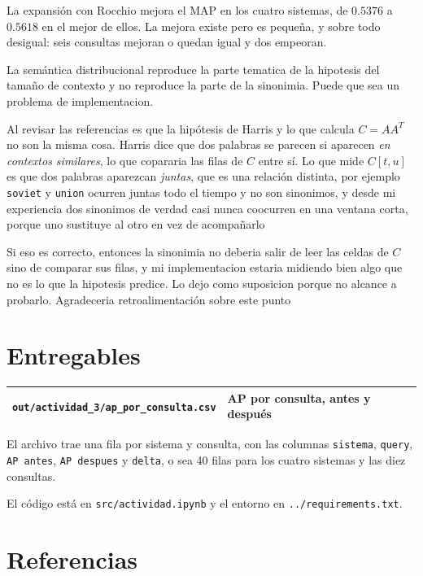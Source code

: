 \documentclass[11pt,letterpaper]{article}
\begin{document}
La expansión con Rocchio mejora el MAP en los cuatro sistemas, de
$0.5376$ a $0.5618$ en el mejor de ellos. La mejora existe pero es
pequeña, y sobre todo desigual: seis consultas mejoran o quedan igual
y dos empeoran.

La semántica distribucional reproduce la parte tematica de la
hipotesis del tamaño de contexto y no reproduce la parte de la
sinonimia. Puede que sea un problema de implementacion.

Al revisar las referencias es que la hipótesis de
Harris y lo que calcula $C = A A^{T}$ no son la misma cosa.
Harris dice que dos palabras se parecen si aparecen \emph{en
contextos similares}, lo que copararia las filas de $C$
entre sí. Lo que mide $C[t,u]$ es que dos palabras aparezcan
\emph{juntas}, que es una relación distinta, por ejemplo \texttt{soviet} y
\texttt{union} ocurren juntas todo el tiempo y no son sinonimos, y 
desde mi experiencia dos sinonimos de verdad casi nunca coocurren en 
una ventana corta, porque uno sustituye al otro en vez de acompañarlo

Si eso es correcto, entonces la sinonimia no deberia salir de leer
las celdas de $C$ sino de comparar sus filas, y mi implementacion
estaria midiendo bien algo que no es lo que la hipotesis predice.
Lo dejo como suposicion porque no alcance a probarlo. Agradeceria
retroalimentación sobre este punto

\section*{Entregables}

\begin{center}
\begin{tabular}{ll}
    \toprule
    \texttt{out/actividad\_3/ap\_por\_consulta.csv}
      & AP por consulta, antes y después \\
    \bottomrule
\end{tabular}
\end{center}

El archivo trae una fila por sistema y consulta, con las columnas
\texttt{sistema}, \texttt{query}, \texttt{AP antes},
\texttt{AP despues} y \texttt{delta}, o sea 40 filas para los cuatro
sistemas y las diez consultas.

El código está en \texttt{src/actividad.ipynb} y el entorno en
\texttt{../requirements.txt}.


\section*{Referencias}
\end{document}
